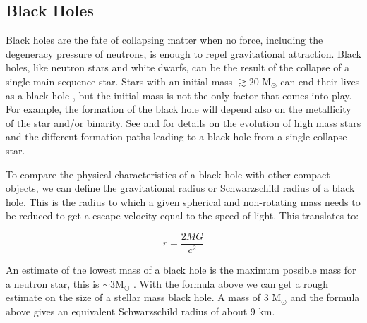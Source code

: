 \subsection{Black Holes}\label{sec:bh}

Black holes are the fate of collapsing matter when no force, including the degeneracy pressure of neutrons, is enough to repel gravitational attraction. Black holes,  like neutron stars and white dwarfs, can be the result of the collapse of a single main sequence star. Stars with an initial mass $\gtrsim  20 \text{ M}_\odot $ can end their lives as a black hole \citep{heger_how_2003}, but the initial mass is not the only factor that comes into play. For example, the formation of the black hole will depend also on the metallicity of the star and/or binarity. See \cite{heger_how_2003} and \cite{brown_evolution_2000} for details on the evolution of high mass stars and the different formation paths leading to a black hole from a single collapse star. 

To compare the physical characteristics of a black hole with other compact objects, we can define the gravitational radius or Schwarzschild radius of a black hole. This is the radius to which a given spherical and non-rotating mass needs to be reduced to get a escape velocity equal to the speed of light. This translates to:

%

\begin{equation}
                r = \frac{2 M G}{c^2}
\end{equation}

An estimate of the lowest mass of a black hole is the maximum possible mass for a neutron star, this is $\sim 3 \text{M}_\odot$ \citep{rhoades_maximum_1974}. With the formula above we can get a rough estimate on the size of a stellar mass black hole. A mass of 3 M$_\odot$ and the formula above gives an equivalent Schwarzschild radius of about 9 km. 

